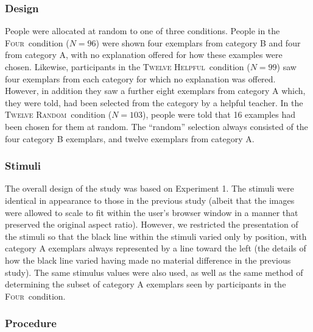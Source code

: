 \documentclass[doc,apacite]{apa6}
\newcommand{\random}{\textsc{Twelve Random}}
\newcommand{\helpful}{\textsc{Twelve Helpful}}
\newcommand{\neutral}{\textsc{Four}}
\begin{document}
\subsubsection{Design}

People were allocated at random to one of three conditions.
People in the \neutral\ condition ($N=96$) were shown four exemplars from
category B and four from category A, with no explanation offered for how these
examples were chosen.
%
Likewise, participants in the \helpful\ condition ($N=99$) saw four
exemplars from each category for which no explanation was offered. However, in
addition they saw a further eight exemplars from category A which, they
were told, had been selected from the category by a helpful teacher.
%
In the \random\ condition ($N=103$), people were told that 16 examples had been
chosen for them at random. The ``random'' selection always consisted of the four
category B exemplars, and twelve exemplars from category A.

\subsubsection{Stimuli}

The overall design of the study was based on Experiment 1.
%
The stimuli were identical in appearance 
to those in the previous study (albeit that the images were allowed to 
scale to fit within the user's browser window in a manner that preserved the 
original aspect ratio). 
%
However, we restricted the presentation of the stimuli so that the black line
within the stimuli varied only by position, with category A exemplars always
represented by a line toward the left (the details of how the black line varied
having made no material difference in the previous study).
%
The same stimulus values were also used, as well as the same method of 
determining the subset of category A exemplars seen by participants in the 
\neutral\ condition. 

\subsubsection{Procedure}
\end{document}

